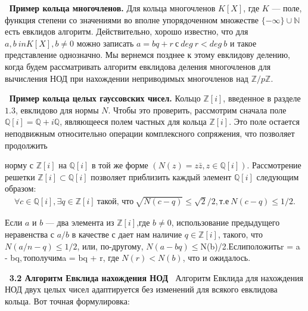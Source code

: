 $\:$\newline
\noindent \textbf{Пример кольца многочленов.}
\newline \indent Для кольца многочленов $K[X]$, где $K$ — поле, функция степени со значениями во вполне упорядоченном множестве $\{-\infty\} \cup \mathds{N}$ есть евклидов алгоритм. Действительно, хорошо известно, что для $a,b \ in K[X], b \ne 0$ можно записать $a = bq + r\:с\:deg\:r < deg\:b$ и такое представление однозначно. Мы вернемся позднее к этому евклидову делению, когда будем рассматривать алгоритм евклидова деления многочленов для вычисления НОД при нахождении неприводимых многочленов над $\mathds{Z}/p\mathds{Z}$.

$\:$\newline
\noindent \textbf{Пример кольца целых гауссовских чисел.}
\newline \indent Кольцо $\mathds{Z}[i]$, введенное в разделе $1.3$, евклидово для нормы $N$. Чтобы это проверить, рассмотрим сначала поле $\mathds{Q}[i] = \mathds{Q} + i\mathds{Q}$, являющееся полем частных для кольца $\mathds{Z}[i]$. Это поле остается неподвижным относительно операции комплексного сопряжения, что позволяет продолжить

\newpage
\noindent норму с $\mathds{Z}[i]$ на $\mathds{Q}[i]$ в той же форме $(N(z) = z\bar{z}, z \in \mathds{Q}[i])$. Рассмотрение решетки $\mathds{Z}[i] \subset \mathds{Q}[i]$ позволяет приблизить каждый элемент $\mathds{Q}[i]$ следующим образом:
\begin{align*}
\forall c \in \mathds{Q}[i], \exists q \in \mathds{Z}[i]\:\text{такой, что}\: \sqrt{N(c-q)} \le \sqrt{2}/2,\text{т.е}\:N(c-q) \le 1/2\text{.}
\end{align*}

\noindent Если $a$ и $b$ — два элемента из $\mathds{Z}[i]$,где $b \ne 0$, использование предыдущего неравенства с $a/b$ в качестве с дает нам наличие $q \in \mathds{Z}[i]$, такого, что $N(a/n - q) \le 1/2$, или, по-другому, $N(a - bq) \le $N(b)/2$. Если положить $r = a - bq$, то получим $a = bq + r, где $N(r) < N(b)$, что и ожидалось.

$\:$ \newline
\textbf{\large 3.2 Алгоритм Евклида нахождения НОД}
$\:$ \newline
Алгоритм Евклида для нахождения НОД двух целых чисел адаптируется без изменений для всякого евклидова кольца. Вот точная формулировка:



